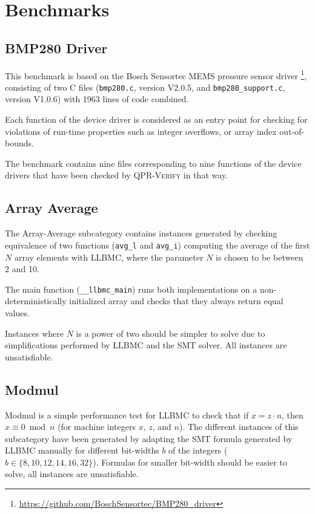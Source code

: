 \documentclass[conference]{IEEEtran}
\begin{document}
\section{Benchmarks}

\subsection{BMP280 Driver}

This benchmark is based on the Bosch Sensortec MEMS pressure sensor
driver \footnote{\url{https://github.com/BoschSensortec/BMP280_driver}},
consisting of two C files (\texttt{bmp280.c}, version V2.0.5, and
\texttt{bmp280\_support.c}, version V1.0.6)
with 1963 lines of code combined.

Each function of the device driver is considered as an entry point for
checking for violations of run-time properties such as integer overflows, or
array index out-of-bounds.

The benchmark contains nine files corresponding to nine functions of the device
drivers that have been checked by \textsc{QPR-Verify} in that way.

\subsection{Array Average}

The Array-Average subcategory contains instances generated by checking 
equivalence of two functions (\texttt{avg\_l} and \texttt{avg\_i})
computing the average of the first $N$ array elements
with LLBMC, where the parameter $N$ is chosen to be between 2 and 10.

The main function (\texttt{\_\_llbmc\_main}) runs both implementations on
a non-deterministically initialized array and checks that they always return equal
values.

Instances where $N$ is a power of two should be simpler to solve due to simplifications
performed by LLBMC and the SMT solver. All instances are unsatisfiable.



\subsection{Modmul}

Modmul is a simple performance test for LLBMC
to check that if $x = z \cdot n$, then $x \equiv 0 \bmod n$ (for machine integers
$x$, $z$, and $n$). The different instances of this subcategory have been generated
by adapting the SMT formula generated by LLBMC manually for different bit-widths $b$ of
the integers ($b \in \{ 8, 10, 12, 14, 16, 32 \}$). Formulas for smaller bit-width should
be easier to solve, all instances are unsatisfiable.
\end{document}
